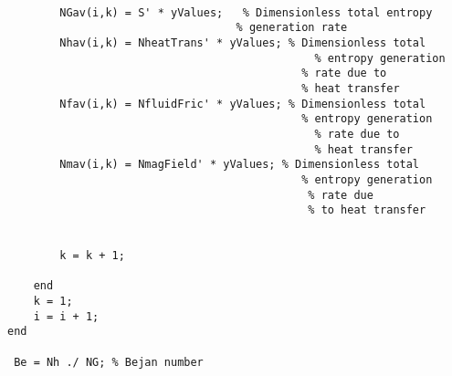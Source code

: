 \begin{lstlisting}
        
        NGav(i,k) = S' * yValues;   % Dimensionless total entropy
                                   % generation rate
        Nhav(i,k) = NheatTrans' * yValues; % Dimensionless total 
        						               % entropy generation  
						                     % rate due to 
						                     % heat transfer
        Nfav(i,k) = NfluidFric' * yValues; % Dimensionless total  
        								     % entropy generation 
								               % rate due to 
								               % heat transfer
        Nmav(i,k) = NmagField' * yValues; % Dimensionless total  
        						             % entropy generation 
								              % rate due 
								              % to heat transfer


        k = k + 1;

    end
    k = 1;
    i = i + 1;
end

 Be = Nh ./ NG; % Bejan number
 



\end{lstlisting}
